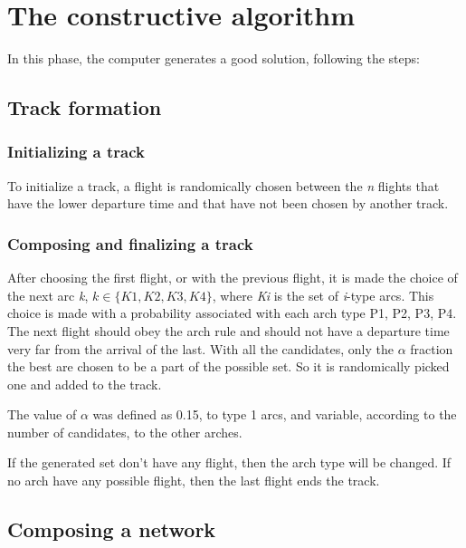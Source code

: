 \documentclass{endm}
\begin{document}

\section{The constructive algorithm}

In this phase, the computer generates a good solution, following the steps:

\subsection{Track formation}
\subsubsection{ Initializing a track }

To initialize a track, a flight is randomically chosen between the \textit{n} flights that have the lower departure time and that have not been chosen by another track.

\subsubsection{ Composing and finalizing a track }

After choosing the first flight, or with the previous flight, it is made the choice of the next arc \textit {k},  $ k \in \{ K1, K2, K3, K4 \} $, where \textit{Ki} is the set of \textit{i}-type arcs. This choice is made with a probability associated with each arch type P1, P2, P3, P4. The next flight should obey the arch rule and should not have a departure time very far from the arrival of the last. With all the candidates, only the $ \alpha $ fraction the best are chosen to be a part of the possible set. So it is randomically picked one and added to the track.

The value of $ \alpha $ was defined as 0.15, to type 1 arcs, and variable, according to the number of candidates, to the other arches.

If the generated set don’t have any flight, then the arch type will be changed. If no arch have any possible flight, then the last flight ends the track.

\subsection{ Composing a network }
\end{document}
